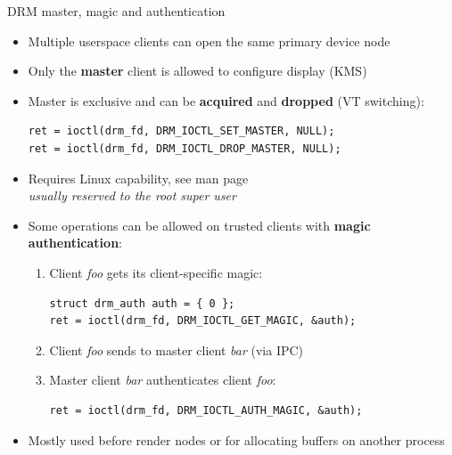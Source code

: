 \begin{frame}[fragile]{DRM master, magic and authentication}
  \begin{itemize}
  \item Multiple userspace clients can open the same primary device node
  \item Only the \textbf{master} client is allowed to configure display (KMS)
  \item Master is exclusive and can be \textbf{acquired} and \textbf{dropped} (VT switching):
  \begin{verbatim}
ret = ioctl(drm_fd, DRM_IOCTL_SET_MASTER, NULL);
ret = ioctl(drm_fd, DRM_IOCTL_DROP_MASTER, NULL);
  \end{verbatim}
  \item Requires  Linux capability, see  man page\\
    \textit{usually reserved to the root super user}
  \item Some operations can be allowed on trusted clients with \textbf{magic authentication}:
  \begin{enumerate}
  \item Client \textit{foo} gets its client-specific magic:
  \begin{verbatim}
struct drm_auth auth = { 0 };
ret = ioctl(drm_fd, DRM_IOCTL_GET_MAGIC, &auth);
  \end{verbatim}
  \item Client \textit{foo} sends  to master client \textit{bar} (via IPC)
  \item Master client \textit{bar} authenticates client \textit{foo}:
  \begin{verbatim}
ret = ioctl(drm_fd, DRM_IOCTL_AUTH_MAGIC, &auth);
  \end{verbatim}
  \end{enumerate}
  \item Mostly used before render nodes or for allocating buffers on another process
  \end{itemize}
\end{frame}


